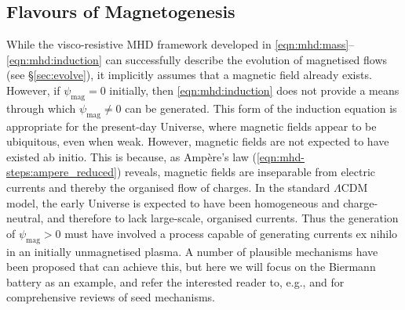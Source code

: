 \documentclass[12pt,twoside]{extreport}
\newcommand{\eg}{e.g.,\xspace} %
\providecommand{\DIFaddtex}[1]{{\protect\color{DIFgreen}\uwave{#1}}} %
\providecommand{\DIFaddbegin}{} %
\providecommand{\DIFaddend}{} %
\providecommand{\DIFadd}[1]{\texorpdfstring{\DIFaddtex{#1}}{#1}} %
\providecommand{\DIFaddincludegraphics}[2][]{{\color{DIFgreen}\fbox{\DIFOincludegraphics[#1]{#2}}}} %
\DeclareRobustCommand{\DIFaddbegin}{\DIFOaddbegin \let\includegraphics\DIFaddincludegraphics} %
\DeclareRobustCommand{\DIFaddend}{\DIFOaddend \let\includegraphics\DIFOincludegraphics} %
\begin{document}
\subsection{Flavours of Magnetogenesis}
\label{sec:modelling:magnetogenesis}

While the visco-resistive MHD framework developed in \autoref{eqn:mhd:mass}--\ref{eqn:mhd:induction} can successfully describe the evolution of magnetised flows (see \S\ref{sec:evolve}), it implicitly assumes that a magnetic field already exists. However, if $\psi_\mathrm{mag} = 0$ initially, then \autoref{eqn:mhd:induction} does not provide a means through which $\psi_\mathrm{mag} \neq 0$ can be generated. This form of the induction equation is appropriate for the present-day Universe, where magnetic fields appear to be ubiquitous, even when weak. However, magnetic fields are not expected to have existed ab initio. This is because, as Amp\`ere's law (\autoref{eqn:mhd-steps:ampere_reduced}) reveals, magnetic fields are inseparable from electric currents and thereby the organised flow of charges. In the standard $\Lambda$CDM model, the early Universe is expected to have been homogeneous and charge-neutral, and therefore to lack large-scale, organised currents. Thus the generation of $\psi_\mathrm{mag} > 0$ must have involved a process capable of generating currents ex nihilo in an initially unmagnetised plasma. A number of plausible mechanisms have been proposed that can achieve this, but here we will focus on the Biermann battery \DIFaddbegin \DIFadd{\mbox{%
\citep{biermann1950ursprung} }\hskip0pt%
}\DIFaddend as an example, and refer the interested reader to, \eg \citet{widrow2012first} and \citet{subramanian2016origin} for comprehensive reviews of seed mechanisms.
\end{document}
